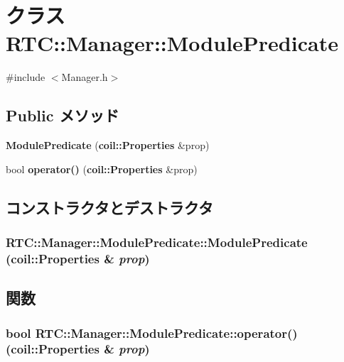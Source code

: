 \section{クラス RTC::Manager::ModulePredicate}
\label{classRTC_1_1Manager_1_1ModulePredicate}


{\ttfamily \#include $<$Manager.h$>$}

\subsection*{Public メソッド}
\begin{DoxyCompactItemize}
\item 
{\bf ModulePredicate} ({\bf coil::Properties} \&prop)
\item 
bool {\bf operator()} ({\bf coil::Properties} \&prop)
\end{DoxyCompactItemize}


\subsection{コンストラクタとデストラクタ}
\subsubsection[{ModulePredicate}]{\setlength{\rightskip}{0pt plus 5cm}RTC::Manager::ModulePredicate::ModulePredicate ({\bf coil::Properties} \& {\em prop})\hspace{0.3cm}{\ttfamily  [inline]}}\label{classRTC_1_1Manager_1_1ModulePredicate_a87f556d3d2b1d8cc0568821c258cad1d}


\subsection{関数}
\subsubsection[{operator()}]{\setlength{\rightskip}{0pt plus 5cm}bool RTC::Manager::ModulePredicate::operator() ({\bf coil::Properties} \& {\em prop})\hspace{0.3cm}{\ttfamily  [inline]}}\label{classRTC_1_1Manager_1_1ModulePredicate_a0ddaada4fc3ed47219fc8bacf7da0aa8}
